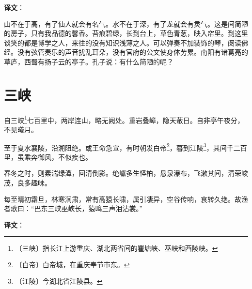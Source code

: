 \documentclass[12pt,UTF-8,openany,a4]{ctexbook}
\begin{document}
\newpage

\begin{Large}
   \noindent \textbf{译文}：
\end{Large}

\vspace{1em}

\begin{large}\yiwen
    
    山不在于高，有了仙人就会有名气。水不在于深，有了龙就会有灵气。这是间简陋的房子，只有我品德的馨香。苔痕碧绿，长到台上，草色青葱，映入帘里。到这里谈笑的都是博学之人，来往的没有知识浅薄之人。可以弹奏不加装饰的琴，阅读佛经。没有弦管奏乐的声音扰乱耳朵，没有官府的公文使身体劳累。南阳有诸葛亮的草庐，西蜀有扬子云的亭子。孔子说：有什么简陋的呢？
    

\end{large}



\chapter{三峡}

\begin{large}
    
    自三峡\footnote{〔三峡〕\yiwen 指长江上游重庆、湖北两省间的瞿塘峡、巫峡和西陵峡。}七百里中，两岸连山，略无阙处。重岩叠嶂，隐天蔽日。自非亭午夜分，不见曦月。
    
    至于夏水襄陵，沿溯阻绝。或王命急宣，有时朝发白帝\footnote{〔白帝〕\yiwen 白帝城，在重庆奉节市东。}，暮到江陵\footnote{〔江陵〕\yiwen 今湖北省江陵县。}，其间千二百里，虽乘奔御风，不似疾也。
    
    春冬之时，则素湍绿潭，回清倒影。绝巘多生怪柏，悬泉瀑布，飞漱其间，清荣峻茂，良多趣味。
    
    每至晴初霜旦，林寒涧肃，常有高猿长啸，属引凄异，空谷传响，哀转久绝。故渔者歌曰：“巴东三峡巫峡长，猿鸣三声泪沾裳。”

\end{large}


\newpage

\begin{Large}
   \noindent \textbf{译文}：
\end{Large}

\vspace{1em}
\end{document}

